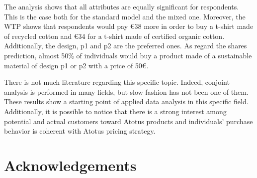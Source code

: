 \documentclass[%
    corpo=12pt,
    twoside, %
    oldstyle,
    autoretitolo,
    greek,
    evenboxes,
]{toptesi}
\begin{document}
The analysis shows that all attributes are equally significant for respondents. This is the case both for the standard model and the mixed one. Moreover, the WTP shows that respondents would pay €38 more in order to buy a t-shirt made of recycled cotton and €34 for a t-shirt made of certified organic cotton. Additionally, the design, p1 and p2 are the preferred ones. As regard the shares prediction, almost 50\% of individuals would buy a product made of a  sustainable material of design p1 or p2 with a price of 50€. 

There is not much literature regarding this specific topic. Indeed, conjoint analysis is performed in many fields, but slow fashion has not been one of them. These results show a starting point of applied data analysis in this specific field. Additionally, it is possible to notice that there is a strong interest among potential and actual customers toward Atotus products and individuals' purchase behavior is coherent with Atotus pricing strategy.




  \tablespagetrue     %
  \figurespagetrue   %
  \indici	             %









%



\backmatter



\printbibliography[heading=bibintoc]

\chapter*{Acknowledgements}
\thispagestyle{empty}
\end{document}

